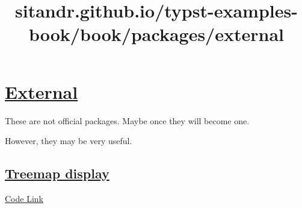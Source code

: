 \title{sitandr.github.io/typst-examples-book/book/packages/external}

\section{\texorpdfstring{\hyperref[external]{External}}{External}}\label{external}

These are not official packages. Maybe once they will become one.

However, they may be very useful.

\subsection{\texorpdfstring{\hyperref[treemap-display]{Treemap
display}}{Treemap display}}\label{treemap-display}

\href{https://gist.github.com/taylorh140/9e353fdf737f1ef51aacb332efdd9516}{Code
Link}

